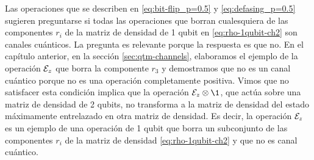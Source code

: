 Las operaciones 	que se describen en \eqref{eq:bit-flip_p=0.5}
y \eqref{eq:defasing_p=0.5} sugieren preguntarse si todas las
operaciones que borran cualesquiera de las componentes $r_i$ 
de la matriz de densidad de 1 qubit 
en \eqref{eq:rho-1qubit-ch2} son canales cuánticos.
La pregunta es relevante porque la respuesta es
que no. En el capítulo anterior, en la sección 
\ref{sec:qtm-channels}, elaboramos el ejemplo de la operación $\mathcal{E}_z$
que borra la componente $r_3$ y demostramos que no es un canal 
cuántico porque no es una operación completamente positiva. 
Vimos que no satisfacer esta condición implica que la operación 
$\E_z\ot\1$, que actúa sobre una matriz de densidad de 2 qubits,
no transforma a la matriz 
de densidad del estado máximamente entrelazado en otra 
matriz de densidad.
Es decir, la operación $\mathcal{E}_z$ es un ejemplo de una 
operación de 1 qubit que borra un subconjunto de las componentes $r_i$ de 
la matriz de densidad \eqref{eq:rho-1qubit-ch2} y que no es canal cuántico.



